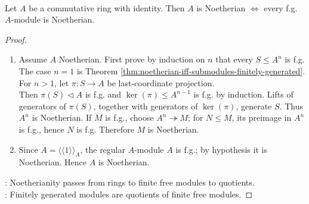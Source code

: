 \begin{theorem} \label{thm:finitely-generated-modules-over-noetherian-rings} \\
Let $A$ be a commutative ring with identity. Then $A$ is Noetherian $\Longleftrightarrow$ every f.g. $A$-module is Noetherian.
\begin{proof}
\begin{enumerate}[label=\roman*.]
\setlength{\itemsep}{0pt}
\item[$(\Rightarrow)$] Assume $A$ Noetherian. First prove by induction on $n$ that every $S\leq A^n$ is f.g.\\
The case $n=1$ is Theorem \ref{thm:noetherian-iff-submodules-finitely-generated}. For $n>1$, let $\pi:S\to A$ be last-coordinate projection.\\
Then $\pi(S)\lhd A$ is f.g. and $\ker(\pi)\leq A^{n-1}$ is f.g. by induction. Lifts of generators of $\pi(S)$, together with generators of $\ker(\pi)$, generate $S$. Thus $A^n$ is Noetherian. If $M$ is f.g., choose $A^n\twoheadrightarrow M$; for $N\leq M$, its preimage in $A^n$ is f.g., hence $N$ is f.g. Therefore $M$ is Noetherian.
\item[$(\Leftarrow)$] Since $A=\langle\!\langle1\rangle\!\rangle_A$, the regular $A$-module $A$ is f.g.; by hypothesis it is Noetherian. Hence $A$ is Noetherian.
\end{enumerate}
\noindent
{}: Noetherianity passes from rings to finite free modules to quotients.\\
: Finitely generated modules are quotients of finite free modules.
\end{proof}
\end{theorem}

